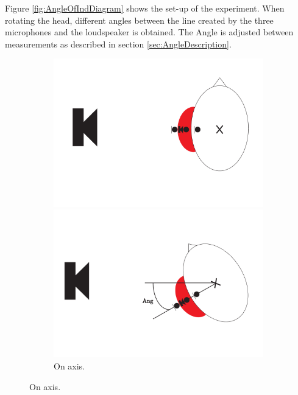 Figure \ref{fig:AngleOfIndDiagram} shows the set-up of the experiment. When rotating the head, different angles between the line created by the three microphones and the loudspeaker is obtained. The Angle is adjusted between measurements as described in section \ref{sec:AngleDescription}. %
\begin{figure}[H]
	\centering
	\begin{subfigure}[b]{.4\textwidth}
		\includegraphics[width=\textwidth]{../Journal/Experiments/AngleOfIncidence/AngleOfIncidenceOnAxis.pdf}
		\caption{On axis.}
		\label{fig:AngOfIndOnax}
		\vspace{2ex}
		\includegraphics[width=\textwidth]{../Journal/Experiments/AngleOfIncidence/AngleOfIncidenceOffAxis.pdf}

\end{subfigure}
\end{figure}

